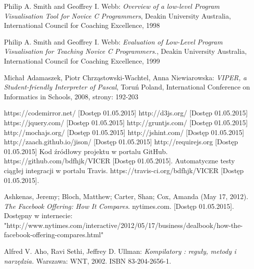 \documentclass[a4paper,twoside,openright,11pt]{report}
\begin{document}
\begin{thebibliography}{99}
  
   Philip A. Smith and Geoffrey I. Webb: \emph{Overview of a low-level Program Visualisation Tool for Novice C Programmers}, Deakin University Australia, International Council for Coaching Excellence, 1998 
  
   Philip A. Smith and Geoffrey I. Webb: \emph{Evaluation of Low-Level Program Visualisation for Teaching Novice C Programmers.}, Deakin University Australia, International Council for Coaching Excellence, 1999
  
   Michał Adamaszek, Piotr Chrząstowski-Wachtel, Anna Niewiarowska: \emph{VIPER, a Student-friendly Interpreter of Pascal}, Toruń Poland, International Conference on Informatics in Schools, 2008, strony: 192-203 
  
   https://codemirror.net/ [Dostęp 01.05.2015]
   http://d3js.org/ [Dostęp 01.05.2015]
   https://jquery.com/ [Dostęp 01.05.2015]
   http://gruntjs.com/ [Dostęp 01.05.2015]
   http://mochajs.org/ [Dostęp 01.05.2015]
   http://jshint.com/ [Dostęp 01.05.2015]
   http://zaach.github.io/jison/ [Dostęp 01.05.2015]
   http://requirejs.org [Dostęp 01.05.2015]
   Kod źródłowy projektu w portalu GitHub. https://github.com/bdfhjk/VICER [Dostęp 01.05.2015]. 
   Automatyczne testy ciągłej integracji w portalu Travis. https://travis-ci.org/bdfhjk/VICER [Dostęp 01.05.2015].

   Ashkenas, Jeremy; Bloch, Matthew; Carter, Shan; Cox, Amanda (May 17, 2012). \emph{The Facebook Offering: How It Compares}. nytimes.com.  [Dostęp 01.05.2015]. Dostępny w internecie: "http://www.nytimes.com/interactive/2012/05/17/business/dealbook/how-the-facebook-offering-compares.html"
  
   Alfred V. Aho, Ravi Sethi, Jeffrey D. Ullman: \emph{Kompilatory : reguły, metody i narzędzia.} Warszawa: WNT, 2002. ISBN 83-204-2656-1.


\end{thebibliography}
\end{document}
